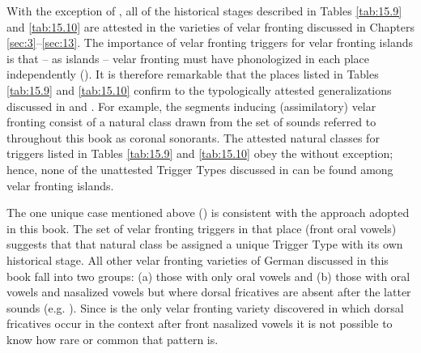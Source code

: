 With the exception of , all of the historical stages described in Tables \ref{tab:15.9} and \ref{tab:15.10} are attested in the varieties of velar fronting discussed in Chapters \ref{sec:3}--\ref{sec:13}. The importance of velar fronting triggers for velar fronting islands is that -- as islands -- velar fronting must have phonologized in each place independently (). It is therefore remarkable that the places listed in Tables \ref{tab:15.9} and \ref{tab:15.10} confirm to the typologically attested generalizations discussed in  and . For example, the segments inducing (assimilatory) velar fronting consist of a natural class drawn from the set of sounds referred to throughout this book as coronal sonorants. The attested natural classes for triggers listed in Tables \ref{tab:15.9} and \ref{tab:15.10} obey the  without exception; hence, none of the unattested Trigger Types discussed in  can be found among velar fronting islands.

The one unique case mentioned above () is consistent with the  approach adopted in this book. The set of velar fronting triggers in that place (front oral vowels) suggests that that natural class be assigned a unique Trigger Type with its own historical stage. All other velar fronting varieties of German discussed in this book fall into two groups: (a) those with only oral vowels and (b) those with oral vowels and nasalized vowels but where dorsal fricatives are absent after the latter sounds (e.g. ). Since  is the only velar fronting variety discovered in which dorsal fricatives occur in the context after front nasalized vowels it is not possible to know how rare or common that pattern is.
